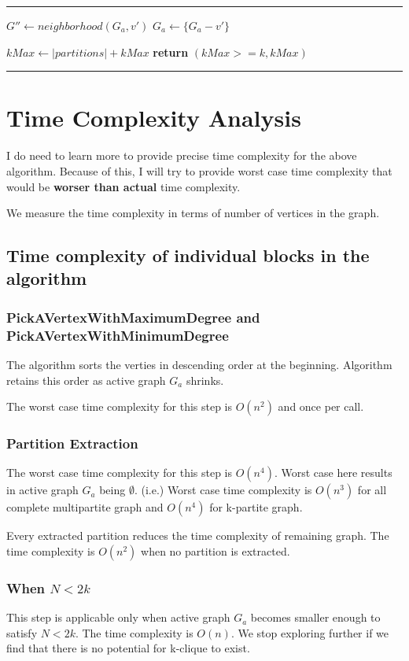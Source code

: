 \documentclass[12pt]{article}
\makeatletter
\theoremstyle{plain}
\theoremstyle{definition}
\newenvironment{breakablealgorithm}
{%
	\begin{center}
		\refstepcounter{algorithm}%
		\hrule height.8pt depth0pt \kern2pt%
		\renewcommand{\caption}[2][\relax]{%
			{\raggedright\textbf{\ALG@name~\thealgorithm} ##2\par}%
			\ifx\relax##1\relax %
			\addcontentsline{loa}{algorithm}{\protect\numberline{\thealgorithm}##2}%
			\else %
			\addcontentsline{loa}{algorithm}{\protect\numberline{\thealgorithm}##1}%
			\fi
			\kern2pt\hrule\kern2pt
		}
	}{%
		\kern2pt\hrule\relax%
	\end{center}
}
\makeatother
\begin{document}
\begin{breakablealgorithm}
\begin{algorithmic}[1]
			\State {}
				\State $G'' \gets neighborhood(G_a, v')$
					\State $G_a \gets \{G_a - v'\}$
				\EndIf
			\EndFor
		\EndWhile

		\State $kMax \gets |partitions| + kMax$
		\State \textbf{return} $(kMax >= k, kMax)$
		\EndFunction
	\end{algorithmic}
\end{breakablealgorithm}

\section{Time Complexity Analysis}
I do need to learn more to provide precise time complexity for the above algorithm. Because of this, I will try to provide worst case time complexity that would be \textbf{worser than actual} time complexity.

We measure the time complexity in terms of number of vertices in the graph.

\subsection{Time complexity of individual blocks in the algorithm}

\subsubsection{PickAVertexWithMaximumDegree and PickAVertexWithMinimumDegree}
The algorithm sorts the verties in descending order at the beginning. Algorithm retains this order as active graph $G_a$ shrinks.

The worst case time complexity for this step is $O(n^2)$ and once per call.

\subsubsection{Partition Extraction}
The worst case time complexity for this step is $O(n^4)$. Worst case here results in active graph $G_a$ being $\emptyset$. (i.e.) Worst case time complexity is $O(n^3)$ for all complete multipartite graph and $O(n^4)$ for k-partite graph.

Every extracted partition reduces the time complexity of remaining graph. The time complexity is $O(n^2)$ when no partition is extracted.

\subsubsection{When $N < 2k$}
This step is applicable only when active graph $G_a$ becomes smaller enough to satisfy $N < 2k$. The time complexity is $O(n)$. We stop exploring further if we find that there is no potential for k-clique to exist.
\end{document}
